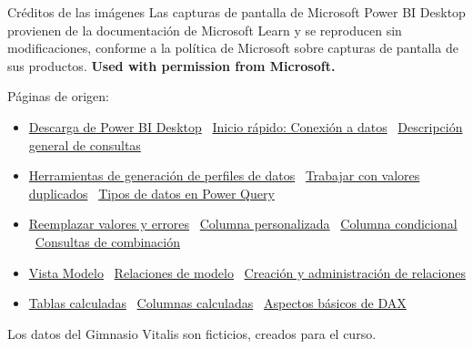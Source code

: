 \documentclass[aspectratio=169,11pt]{beamer}
\newcommand{\urlconsultas}{https://learn.microsoft.com/es-es/power-bi/transform-model/desktop-query-overview}
\newcommand{\urlconectar}{https://learn.microsoft.com/es-es/power-bi/connect-data/desktop-quickstart-connect-to-data}
\newcommand{\urlrelentender}{https://learn.microsoft.com/es-es/power-bi/transform-model/desktop-relationships-understand}
\begin{document}
\begin{frame}[t]{Créditos de las imágenes}
  \scriptsize
  Las capturas de pantalla de Microsoft Power BI Desktop provienen de la
  documentación de Microsoft Learn y se reproducen sin modificaciones,
  conforme a la política de Microsoft sobre capturas de pantalla de sus
  productos. \textbf{Used with permission from Microsoft.}
  \vspace{0.15cm}

  Páginas de origen:
  \begin{itemize}
    \scriptsize
    \item \href{https://learn.microsoft.com/es-es/power-bi/fundamentals/desktop-get-the-desktop}{Descarga de Power BI Desktop}
      \textperiodcentered\ \href{\urlconectar}{Inicio rápido: Conexión a datos}
      \textperiodcentered\ \href{\urlconsultas}{Descripción general de consultas}
    \item \href{https://learn.microsoft.com/es-es/power-query/data-profiling-tools}{Herramientas de generación de perfiles de datos}
      \textperiodcentered\ \href{https://learn.microsoft.com/es-es/power-query/working-with-duplicates}{Trabajar con valores duplicados}
      \textperiodcentered\ \href{https://learn.microsoft.com/es-es/power-query/data-types}{Tipos de datos en Power Query}
    \item \href{https://learn.microsoft.com/es-es/power-query/replace-values}{Reemplazar valores y errores}
      \textperiodcentered\ \href{https://learn.microsoft.com/es-es/power-query/add-custom-column}{Columna personalizada}
      \textperiodcentered\ \href{https://learn.microsoft.com/es-es/power-query/add-conditional-column}{Columna condicional}
      \textperiodcentered\ \href{https://learn.microsoft.com/es-es/power-query/merge-queries-overview}{Consultas de combinación}
    \item \href{https://learn.microsoft.com/es-es/power-bi/transform-model/desktop-modeling-view}{Vista Modelo}
      \textperiodcentered\ \href{\urlrelentender}{Relaciones de modelo}
      \textperiodcentered\ \href{https://learn.microsoft.com/es-es/power-bi/transform-model/desktop-create-and-manage-relationships}{Creación y administración de relaciones}
    \item \href{https://learn.microsoft.com/es-es/power-bi/transform-model/desktop-calculated-tables}{Tablas calculadas}
      \textperiodcentered\ \href{https://learn.microsoft.com/es-es/power-bi/transform-model/desktop-tutorial-create-calculated-columns}{Columnas calculadas}
      \textperiodcentered\ \href{https://learn.microsoft.com/es-es/power-bi/transform-model/desktop-quickstart-learn-dax-basics}{Aspectos básicos de DAX}
  \end{itemize}
  \vspace{0.1cm}
  Los datos del Gimnasio Vitalis son ficticios, creados para el curso.
\end{frame}
\end{document}
